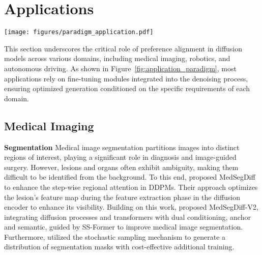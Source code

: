\section{Applications}
\label{sec:applications}


\begin{figure*}[t]
    \centering
    \texttt{[image: figures/paradigm\_application.pdf]}
    \caption{General paradigm of preference alignment for various \textbf{condition modules} on DM applications.}
    \label{fig:application_paradigm}
\end{figure*}
This section underscores the critical role of preference alignment in diffusion models across various domains, including medical imaging, robotics, and autonomous driving. As shown in Figure~\ref{fig:application_paradigm}, most applications rely on fine-tuning modules integrated into the denoising process, ensuring optimized generation conditioned on the specific requirements of each domain.
\subsection{Medical Imaging}

\textbf{Segmentation} Medical image segmentation partitions images into distinct regions of interest, playing a significant role in diagnosis and image-guided surgery. However, lesions and organs often exhibit ambiguity, making them difficult to be identified from the background. To this end, \citet{wu2022medsegdiff} proposed MedSegDiff to enhance the step-wise regional attention in DDPMs. Their approach optimizes the lesion’s feature map during the feature extraction phase in the diffusion encoder to enhance its visibility. Building on this work, \citet{wu2024medsegdiff} proposed MedSegDiff-V2, integrating diffusion processes and transformers with dual conditioning, anchor and semantic, guided by SS-Former to improve medical image segmentation. Furthermore, \citet{rahman2023ambiguous} utilized the stochastic sampling mechanism to generate a distribution of segmentation masks with cost-effective additional training.

